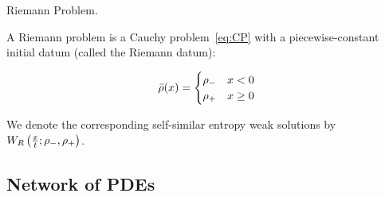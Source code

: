%
%
%
%
%
\begin{defn}
\label{def:Riemann-Problem}Riemann Problem.

A Riemann problem is a Cauchy problem~\eqref{eq:CP} with a piecewise-constant initial datum (called the Riemann datum):

\[
\bar{\rho}(x)=\begin{cases}
\rho_{-} & x<0\\
\rho_{+} & x\ge 0
\end{cases}
\]
\end{defn}
We denote the corresponding self-similar entropy weak solutions by $W_{R}\left(\frac{x}{t};\rho_{-},\rho_{+}\right)$.


\subsection{Network of PDEs\label{sub:Network-of-PDE's}}

